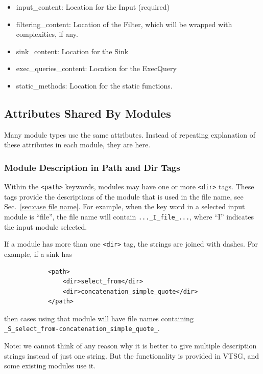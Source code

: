 \documentclass[12pt]{article}
\begin{document}
\begin{itemize}
\begin{itemize}
        \item input\_content:  Location for the Input (required)

        \item filtering\_content: Location of the Filter, which will be wrapped with
          complexities, if any.

        \item sink\_content:  Location for the Sink

        \item exec\_queries\_content:  Location for the ExecQuery

        \item static\_methods:  Location for the static functions.
    \end{itemize}
\end{itemize}


\subsection{Attributes Shared By Modules}
\label{sec:shared attributes}

Many module types use the same attributes.  Instead of repeating explanation of
these attributes in each module, they are here.

\subsubsection{Module Description in Path and Dir Tags}
\label{sec:module description}

Within the \verb|<path>| keywords, modules may have one or more \verb|<dir>| tags.
These tags provide the descriptions of the module that is used in the file name, see
Sec.~\ref{sec:case file name}.  For example, when the key word in a selected input
module is ``file'', the file name will contain \verb|..._I_file_...|, where ``I''
indicates the input module selected.

If a module has more than one \verb|<dir>| tag, the strings are joined with dashes.
For example, if a sink has
\begin{verbatim}
            <path>
                <dir>select_from</dir>
                <dir>concatenation_simple_quote</dir>
            </path>
\end{verbatim}
then cases using that module will have file names containing \\
\verb|_S_select_from-concatenation_simple_quote_|.

Note: we cannot think of any reason why it is better to give multiple description
strings instead of just one string.  But the functionality is provided in VTSG, and
some existing modules use it.
\end{document}

